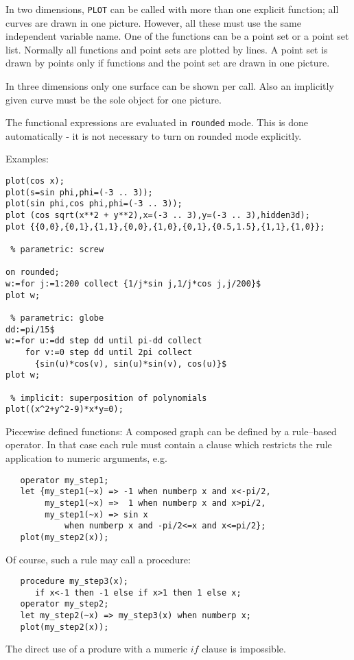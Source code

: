 In two dimensions,  \verb+PLOT+ can be called with
more than one explicit function; all curves 
are drawn in one picture. However,
all these must use the same independent variable name.
One of the functions can be a point set or a point set list.
Normally all functions and point sets are plotted by
lines. A point set is drawn by points only if functions and 
the point set are drawn in one picture.

In three dimensions only one surface can be shown per call.
Also an implicitly given curve  must be the sole object for one
picture.

The functional expressions are evaluated in \verb$rounded$ mode.
This is done automatically - it is not necessary to turn
on rounded mode explicitly. 

\newpage

Examples:
\begin{verbatim}
plot(cos x);
plot(s=sin phi,phi=(-3 .. 3));
plot(sin phi,cos phi,phi=(-3 .. 3));
plot (cos sqrt(x**2 + y**2),x=(-3 .. 3),y=(-3 .. 3),hidden3d);
plot {{0,0},{0,1},{1,1},{0,0},{1,0},{0,1},{0.5,1.5},{1,1},{1,0}};

 % parametric: screw

on rounded;
w:=for j:=1:200 collect {1/j*sin j,1/j*cos j,j/200}$
plot w;

 % parametric: globe
dd:=pi/15$
w:=for u:=dd step dd until pi-dd collect
    for v:=0 step dd until 2pi collect
      {sin(u)*cos(v), sin(u)*sin(v), cos(u)}$
plot w;

 % implicit: superposition of polynomials
plot((x^2+y^2-9)*x*y=0);
\end{verbatim}
 
Piecewise defined functions: 
A composed graph can be defined by a rule--based operator.
In that case each rule must contain a clause which restricts
the rule application to numeric arguments, e.g.
\begin{verbatim}
   operator my_step1;
   let {my_step1(~x) => -1 when numberp x and x<-pi/2, 
        my_step1(~x) =>  1 when numberp x and x>pi/2,
        my_step1(~x) => sin x
            when numberp x and -pi/2<=x and x<=pi/2};
   plot(my_step2(x));
\end{verbatim}
Of course, such a rule may call a procedure:
\begin{verbatim}
   procedure my_step3(x);
      if x<-1 then -1 else if x>1 then 1 else x;
   operator my_step2;
   let my_step2(~x) => my_step3(x) when numberp x; 
   plot(my_step2(x));
\end{verbatim}
The direct use of a produre with a numeric $if$ clause
is impossible. 

